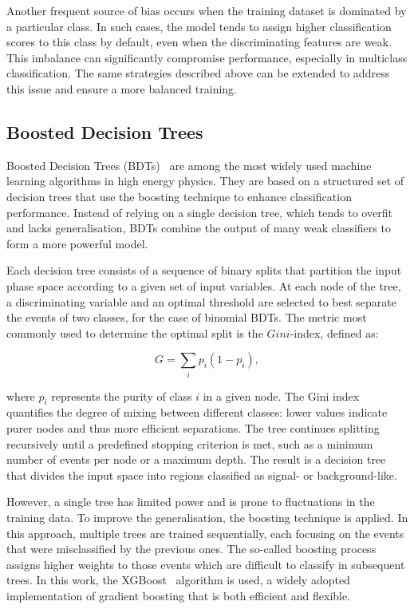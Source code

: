 Another frequent source of bias occurs when the training dataset is dominated by a particular class. In such cases, the model tends to assign higher classification scores to this class by default, even when the discriminating features are weak. This imbalance can significantly compromise performance, especially in multiclass classification. The same strategies described above can be extended to address this issue and ensure a more balanced training.



\subsection{Boosted Decision Trees}
\label{subsec:bdt_general}

Boosted Decision Trees (BDTs)~\cite{bdts} are among the most widely used machine learning algorithms in high energy physics. They are based on a structured set of decision trees that use the boosting technique to enhance classification performance. Instead of relying on a single decision tree, which tends to overfit and lacks generalisation, BDTs combine the output of many weak classifiers to form a more powerful model.

Each decision tree consists of a sequence of binary splits that partition the input phase space according to a given set of input variables. At each node of the tree, a discriminating variable and an optimal threshold are selected to best separate the events of two classes, for the case of binomial BDTs. The metric most commonly used to determine the optimal split is the $Gini$-index, defined as:

\begin{equation}
G = \sum_{i} p_i (1 - p_i),
\end{equation}

where $p_i$ represents the purity of class $i$ in a given node. The Gini index quantifies the degree of mixing between different classes: lower values indicate purer nodes and thus more efficient separations. The tree continues splitting recursively until a predefined stopping criterion is met, such as a minimum number of events per node or a maximum depth. The result is a decision tree that divides the input space into regions classified as signal- or background-like.

However, a single tree has limited power and is prone to fluctuations in the training data. To improve the generalisation, the boosting technique is applied. In this approach, multiple trees are trained sequentially, each focusing on the events that were misclassified by the previous ones. The so-called boosting process assigns higher weights to those events which are difficult to classify in subsequent trees. In this work, the XGBoost~\cite{xgboost} algorithm is used, a widely adopted implementation of gradient boosting that is both efficient and flexible.

